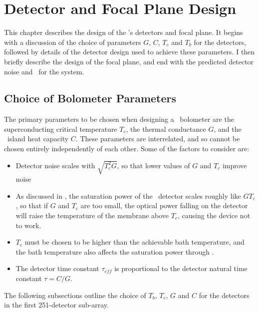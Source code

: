 \chapter{Detector and Focal Plane Design}\label{c:det-design}

This chapter describes the design of the \Imager's detectors and focal plane.
It begins with a discussion of the choice of parameters $G$, $C$, $T_c$ and $T_b$ for the detectors, followed by details of the detector design used to achieve these parameters.
I then briefly describe the design of the focal plane, and end with the predicted detector noise and \NETD\ for the system.

\section{Choice of Bolometer Parameters} \label{sec:det-parm-choice}

The primary parameters to be chosen when designing a \TES\ bolometer are the superconducting critical temperature $T_c$, the thermal conductance $G$, and the \TES\ island heat capacity $C$.
These parameters are interrelated, and so cannot be chosen entirely independently of each other.
Some of the factors to consider are:
\begin{itemize}
  \item Detector noise scales with $\sqrt{T_c^2 G}$, so that lower values of $G$ and $T_c$ improve noise
  \item As discussed in , the saturation power of the \TES\ detector scales roughly like $G T_c$, so that if $G$ and $T_c$ are too small, the optical power falling on the detector will raise the temperature of the membrane above $T_c$, causing the device not to work.
  \item $T_c$ must be chosen to be higher than the achievable bath temperature, and the bath temperature also affects the saturation power through .
  \item The detector time constant $\tau_{eff}$ is proportional to the detector natural time constant $\tau = C / G$.
\end{itemize}


The following subsections outline the choice of $T_b$, $T_c$, $G$ and $C$ for the detectors in the first 251-detector sub-array.

